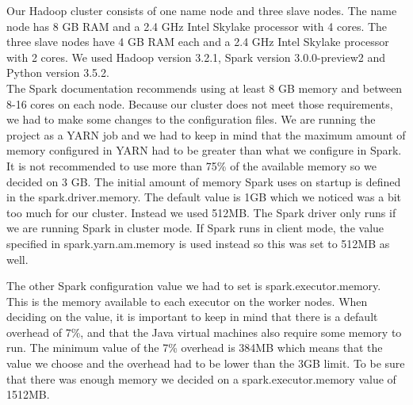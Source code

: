 Our Hadoop cluster consists of one name node and three slave nodes.
The name node has 8 GB RAM and a 2.4 GHz Intel Skylake processor with 4 cores.
The three slave nodes have 4 GB RAM each and a 2.4 GHz Intel Skylake processor with 2 cores.
We used Hadoop version 3.2.1, Spark version 3.0.0-preview2 and Python version 3.5.2.
\\
The Spark documentation recommends using at least 8 GB memory and between 8-16 cores on each node\cite{SparkHardware}. Because our cluster does not meet those requirements, we had to make some changes to the configuration files. We are running the project as a YARN job and we had to keep in mind that the maximum amount of memory configured in YARN had to be greater than what we configure in Spark. It is not recommended to use more than 75\% of the available memory so we decided on 3 GB. The initial amount of memory Spark uses on startup is defined in the spark.driver.memory. The default value is 1GB which we noticed was a bit too much for our cluster. Instead we used 512MB. The Spark driver only runs if we are running Spark in cluster mode. If Spark runs in client mode, the value specified in spark.yarn.am.memory is used instead so this was set to 512MB as well. 

The other Spark configuration value we had to set is spark.executor.memory. This is the memory available to each executor on the worker nodes. When deciding on the value, it is important to keep in mind that there is a default overhead of 7\%, and that the Java virtual machines also require some memory to run. The minimum value of the 7\% overhead is 384MB\cite{SparkOverhead} which means that the value we choose and the overhead had to be lower than the 3GB limit. To be sure that there was enough memory we decided on a spark.executor.memory value of 1512MB.